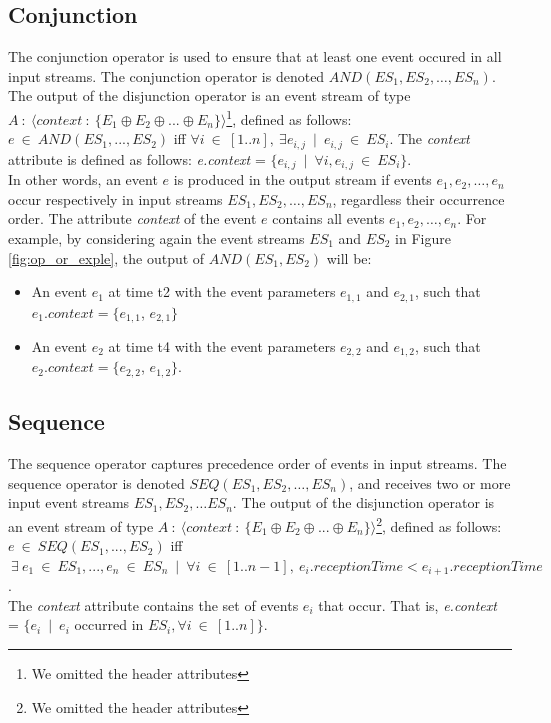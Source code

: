 \subsection{Conjunction}
  The conjunction operator is used to ensure that at least one event occured in all input streams. The conjunction operator is  denoted $AND(ES_1, ES_2, …, ES_n)$. 
   The output of the disjunction operator is an event stream of type $A\ :\ \langle context\ :\ \{E_1\oplus E_2\oplus ... \oplus E_n\} \rangle$\footnote{We omitted the header attributes}, defined as follows:
    $e\ \in\ AND(ES_1, ..., ES_2)$ iff $\forall i\ \in\ [1..n],\ \exists e_{i,j}\ \mid\ e_{i,j}\ \in\ ES_i$. The \textit{context} attribute is defined as follows: \textit{e.context} = $\{e_{i,j}\ \mid\ \forall i, e_{i,j}\ \in\ ES_i\}$.    
  \\In other words, an event $e$ is produced in the output stream if events $e_1, e_2, …, e_n$ occur respectively in input streams $ES_1, ES_2, …, ES_n$, regardless their occurrence order. The attribute \textit{context} of the event $e$ contains all events $e_1, e_2, …, e_n$.
 For example, by considering again the event streams $ES_1$ and $ES_2$ in Figure \ref{fig:op_or_exple}, the output of $AND(ES_1, ES_2)$ will be:
 \begin{itemize}
  \item An event $e_1$ at time t2 with the event parameters $e_{1,1}$ and $e_{2,1}$, such that $e_1.context=\{ e_{1,1}$, $e_{2,1}\}$
  \item An event $e_2$ at time t4 with the event parameters $e_{2,2}$ and $e_{1,2}$, such that $e_2.context=\{ e_{2,2}$, $e_{1,2}\}$.
 \end{itemize}
 \subsection{Sequence}
 The sequence operator captures precedence order of events in input streams. The sequence operator is denoted $SEQ(ES_1, ES_2, …, ES_n)$, and receives two or more input event streams $ES_1, ES_2, … ES_n$. 
  The output of the disjunction operator is an event stream of type $A\ :\ \langle context\ :\ \{E_1\oplus E_2\oplus ... \oplus E_n\} \rangle$\footnote{We omitted the header attributes}, defined as follows:\\
$e\ \in\ SEQ(ES_1, ..., ES_2)$ iff $\ \exists\ e_{1}\ \in\ ES_1, ..., e_{n}\ \in\ ES_n\ \mid\ \forall i\ \in\ [1..n-1],\ e_{i}.receptionTime < e_{i+1}.receptionTime$.
\\The \textit{context} attribute contains the set of events $e_i$ that occur. That is, \textit{e.context} = $\{e_{i}\ \mid\ e_{i}$ occurred in $ES_i, \forall i\ \in\ [1..n]\}$.
  

